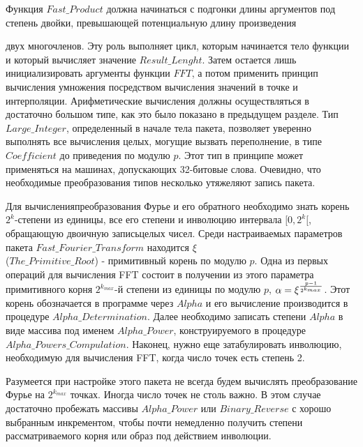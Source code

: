 \documentclass{mai_book}
\begin{document}
\bigskip	
	
	Функция $Fast \_ Product$ должна начинаться с подгонки длины аргументов под степень двойки, превышающей потенциальную длину произведения
	
	\newpage
	
	
	\noindent двух многочленов. Эту роль выполняет цикл, которым начинается тело функции и который вычисляет значение $Result \_ Lenght$. Затем остается лишь инициализировать аргументы функции $FFT$, а потом применить принцип вычисления умножения посредством вычисления значений в точке и интерполяции. Арифметические вычисления должны осуществляться в достаточно большом типе, как это было показано в предыдущем разделе. Тип $Large \_ Integer$, определенный в начале тела пакета, позволяет уверенно выполнять все вычисления целых, могущие вызвать переполнение, в типе $Coefficient$ до приведения по модулю $p$. Этот тип в принципе может применяться на машинах, допускающих 32-битовые слова. Очевидно, что необходимые преобразования типов несколько утяжеляют запись пакета.
	
	\bigskip
	
	
	\medskip
	
	\noindent Для вычисленияпреобразования Фурье и его обратного необходимо знать корень $2^k$-степени из единицы, все его степени и инволюцию интервала $[0,2^k[$, обращающую двоичную записьцелых чисел. Среди настраиваемых параметров пакета $Fast \_ Fourier \_ Transform$ находится $\xi$ \\ ($The \_ Primitive \_ Root$) - примитивный корень по модулю $p$. Одна из первых операций для вычисления FFT состоит в получении из этого параметра примитивного корня $2^{k_{max}}$-й степени из единицы по модулю $p$, $\alpha = \xi^{p-1 \over 2^{k_{max}}}$. Этот корень обозначается в программе через $Alpha$ и его вычисление производится в процедуре $Alpha \_ Determination$. Далее необходимо записать степени $Alpha$ в виде массива под именем $Alpha \_ Power$, конструируемого в процедуре $Alpha \_ Powers \_ Compulation$. Наконец, нужно еще затабулировать инволюцию, необходимую для вычисления FFT, когда число точек есть степень 2.
	
	Разумеется при настройке этого пакета не всегда будем вычислять преобразование Фурье на $2^{k_{max}}$ точках. Иногда число точек не столь важно. В этом случае достаточно пробежать массивы $Alpha \_ Power$ или $Binary \_ Reverse$ с хорошо выбранным инкрементом, чтобы почти немедленно получить степени рассматриваемого корня или образ под действием инволюции.
	
\end{document}
